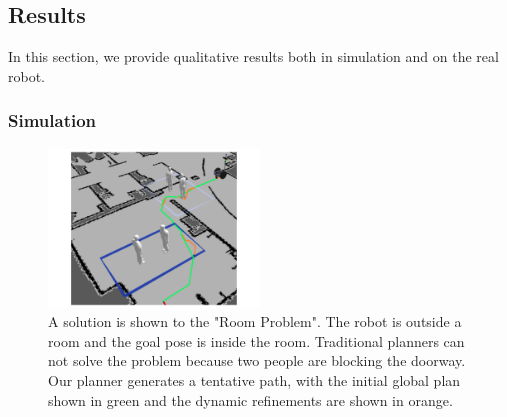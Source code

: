 
\subsection{Results}
\label{sec:navigation_results}

In this section, we provide qualitative results both in simulation and on the real robot.

\subsubsection{Simulation}
\label{sec:navigation_results_simulation}

\begin{figure}[ht!]
\centering
\includegraphics[width=0.5\textwidth]{pics/room_sol_crop}
\caption{A solution is shown to the "Room Problem". The robot is outside a room and the goal pose is inside the room. Traditional planners can not solve the problem because two people are blocking the doorway. Our planner generates a tentative path, with the initial global plan shown in green and the dynamic refinements are shown in orange.}
\label{fig:room_sol}
\end{figure}

